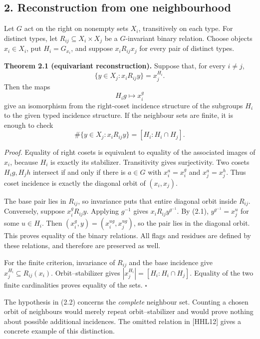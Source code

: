 \documentclass[
  11pt,
  a4paper,
]{article}
\newcounter{none} %
\begin{document}
\subsection{2. Reconstruction from one
neighbourhood}\label{reconstruction-from-one-neighbourhood}

Let \(G\) act on the right on nonempty sets \(X_i\), transitively on
each type. For distinct types, let \(R_{ij}\subseteq X_i\times X_j\) be
a \(G\)-invariant binary relation. Choose objects \(x_i\in X_i\), put
\(H_i=G_{x_i}\), and suppose \(x_i R_{ij}x_j\) for every pair of
distinct types.

\textbf{Theorem 2.1 (equivariant reconstruction).} Suppose that, for
every \(i\ne j\), \[
 \{y\in X_j:x_iR_{ij}y\}=x_j^{H_i}.
 \tag{2.1}
\] Then the maps \[
 H_i g\longmapsto x_i^g
\] give an isomorphism from the right-coset incidence structure of the
subgroups \(H_i\) to the given typed incidence structure. If the
neighbour sets are finite, it is enough to check \[
 \#\{y\in X_j:x_iR_{ij}y\}
   =[H_i:H_i\cap H_j].
 \tag{2.2}
\]

\emph{Proof.} Equality of right cosets is equivalent to equality of the
associated images of \(x_i\), because \(H_i\) is exactly its stabilizer.
Transitivity gives surjectivity. Two cosets \(H_i g,H_j h\) intersect if
and only if there is \(a\in G\) with \(x_i^a=x_i^g\) and
\(x_j^a=x_j^h\). Thus coset incidence is exactly the diagonal orbit of
\((x_i,x_j)\).

The base pair lies in \(R_{ij}\), so invariance puts that entire
diagonal orbit inside \(R_{ij}\). Conversely, suppose \(x_i^gR_{ij}y\).
Applying \(g^{-1}\) gives \(x_iR_{ij}y^{g^{-1}}\). By (2.1),
\(y^{g^{-1}}=x_j^u\) for some \(u\in H_i\). Then
\((x_i^g,y)=(x_i^{ug},x_j^{ug})\), so the pair lies in the diagonal
orbit. This proves equality of the binary relations. All flags and
residues are defined by these relations, and therefore are preserved as
well.

For the finite criterion, invariance of \(R_{ij}\) and the base
incidence give \(x_j^{H_i}\subseteq R_{ij}(x_i)\). Orbit--stabilizer
gives \(|x_j^{H_i}|=[H_i:H_i\cap H_j]\). Equality of the two finite
cardinalities proves equality of the sets. \(\square\)

The hypothesis in (2.2) concerns the \emph{complete} neighbour set.
Counting a chosen orbit of neighbours would merely repeat
orbit--stabilizer and would prove nothing about possible additional
incidences. The omitted relation in {[}HHL12{]} gives a concrete example
of this distinction.
\end{document}
